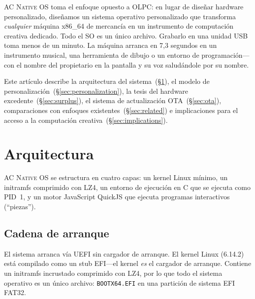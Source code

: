 \documentclass[10pt,letterpaper,twocolumn]{article}
\newcommand{\acos}{\textsc{AC Native OS}}
\begin{document}
\acos{} toma el enfoque opuesto a OLPC: en lugar de diseñar hardware personalizado, diseñamos un sistema operativo personalizado que transforma \emph{cualquier} máquina x86\_64 de mercancía en un instrumento de computación creativa dedicado. Todo el SO es un único archivo. Grabarlo en una unidad USB toma menos de un minuto. La máquina arranca en 7,3 segundos en un instrumento musical, una herramienta de dibujo o un entorno de programación---con el nombre del propietario en la pantalla y su voz saludándole por su nombre.

Este artículo describe la arquitectura del sistema~(\S\ref{sec:architecture}), el modelo de personalización~(\S\ref{sec:personalization}), la tesis del hardware excedente~(\S\ref{sec:surplus}), el sistema de actualización OTA~(\S\ref{sec:ota}), comparaciones con enfoques existentes~(\S\ref{sec:related}) e implicaciones para el acceso a la computación creativa~(\S\ref{sec:implications}).

\section{Arquitectura}
\label{sec:architecture}

\acos{} se estructura en cuatro capas: un kernel Linux mínimo, un initramfs comprimido con LZ4, un entorno de ejecución en C que se ejecuta como PID~1, y un motor JavaScript QuickJS que ejecuta programas interactivos (``piezas'').

\subsection{Cadena de arranque}

El sistema arranca vía UEFI sin cargador de arranque. El kernel Linux (6.14.2) está compilado como un stub EFI---el kernel \emph{es} el cargador de arranque. Contiene un initramfs incrustado comprimido con LZ4, por lo que todo el sistema operativo es un único archivo: \texttt{BOOTX64.EFI} en una partición de sistema EFI FAT32.
\end{document}
